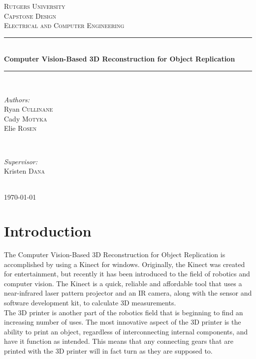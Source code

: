 \documentclass[12pt,twocolumn]{article}
\begin{document}
\begin{titlepage}
\newcommand{\HRule}{\rule{\linewidth}{0.5mm}}
\center
\textsc{\LARGE Rutgers University}\\[1.5cm] 
\textsc{\Large Capstone Design}\\[0.5cm] 
\textsc{\large Electrical and Computer Engineering}\\[0.5cm]
\HRule \\[0.4cm]
{ \huge \bfseries Computer Vision-Based 3D Reconstruction for Object Replication}\\[0.4cm] 
\HRule \\[1.5cm]
\begin{minipage}{0.4\textwidth}
\begin{flushleft} \large
\emph{Authors:}\\
Ryan \textsc{Cullinane}\\
Cady \textsc{Motyka}\\
Elie \textsc{Rosen}
\end{flushleft}
\end{minipage}
~
\begin{minipage}{0.4\textwidth}
\begin{flushright} \large
\emph{Supervisor:} \\
Kristen \textsc{Dana} 
\end{flushright}
\end{minipage}\\[4cm]
{\large \today}\\[3cm]
\vfill 
\end{titlepage}

\section{Introduction}
The Computer Vision-Based 3D Reconstruction for Object Replication is accomplished by using a Kinect for windows. Originally, the Kinect was created for entertainment, but recently it has been introduced to the field of robotics and computer vision. The Kinect is a quick, reliable and affordable tool that uses a near-infrared laser pattern projector and an IR camera, along with the sensor and software development kit, to calculate 3D measurements.  \\
\indent The 3D printer is another part of the robotics field that is beginning to find an increasing number of uses. The most innovative aspect of the 3D printer is the ability to print an object, regardless of interconnecting internal components, and have it function as intended. This means that any connecting gears that are printed with the 3D printer will in fact turn as they are supposed to. \\
\end{document}

